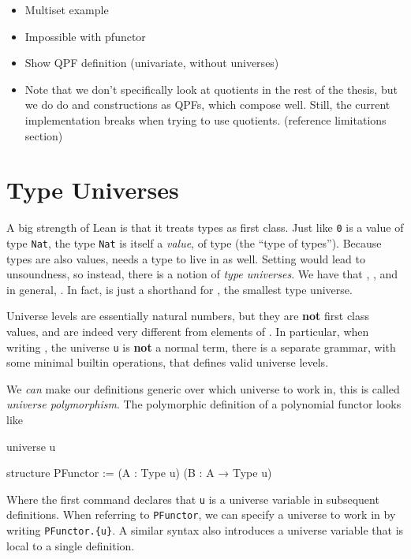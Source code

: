 \documentclass[titlepage]{report}
\newenvironment{todo}{\begin{shaded}\begin{trivlist}                         
    \item[\hskip \labelsep {\bfseries Todo:}]}{\end{trivlist}\end{shaded}}
\newcommand\data{\lean{data}}
\newcommand\codata{\lean{codata}}
\newcommand\Type{\lean{Type}}
\newcommand\Typen[1]{\lean{Type #1}}
\begin{document}
\begin{todo}
    \begin{itemize}
        \item Multiset example
        \item Impossible with pfunctor
        \item Show QPF definition (univariate, without universes)
        \item Note that we don't specifically look at quotients in the rest of the thesis, but we do do \data and \codata constructions as QPFs, which compose well. Still, the current implementation breaks when trying to use quotients. (reference limitations section)
    \end{itemize}
\end{todo}











\section{Type Universes}
\label{sec:bg:universes}

A big strength of Lean is that it treats types as first class. Just like \texttt{0} is a value of type \texttt{Nat}, the type \texttt{Nat} is itself a \emph{value}, of type \Type (the ``type of types''). Because types are also values, \Type needs a type to live in as well. Setting  would lead to unsoundness, so instead, there is a notion of \emph{type universes}. We have that , , and in general, . In fact,  is just a shorthand for , the smallest type universe.

Universe levels are essentially natural numbers, but they are \textbf{not} first class values, and are indeed very different from elements of .
In particular, when writing \Typen{u}, the universe \texttt{u} is \textbf{not} a normal term, there is a separate grammar, with some minimal builtin operations, that defines valid universe levels.

We \emph{can} make our definitions generic over which universe to work in, this is called \emph{universe polymorphism}. The polymorphic definition of a polynomial functor looks like
\begin{leancode}
    universe u

    structure PFunctor := (A : Type u) (B : A → Type u)
\end{leancode}
Where the first command declares that \texttt{u} is a universe variable in subsequent definitions.
When referring to \texttt{PFunctor}, we can specify a universe to work in by writing \texttt{PFunctor.\{u\}}. A similar syntax also introduces a universe variable that is local to a single definition.
\end{document}
